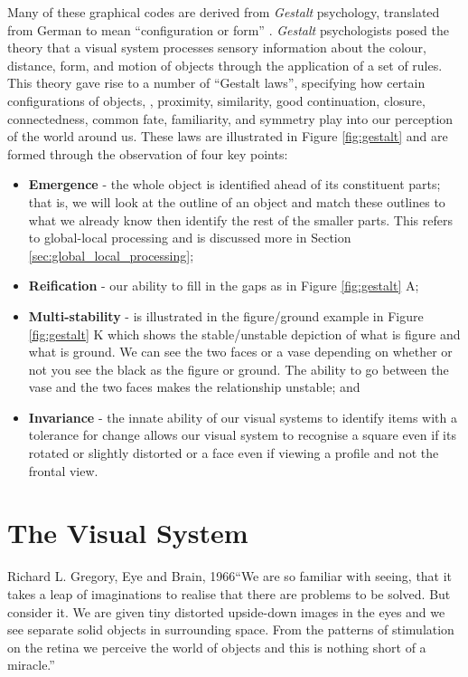 Many of these graphical codes are derived from \emph{Gestalt} psychology, translated from German to mean ``configuration or form'' \cite{kandel2012principles}. 
\emph{Gestalt} psychologists posed the theory that a visual system processes sensory information about the colour, distance, form, and motion of objects through the application of a set of rules. 
This theory gave rise to a number of ``Gestalt laws'', specifying how certain configurations of objects, \eg, proximity, similarity, good continuation, closure, connectedness, common fate, familiarity, and symmetry play into our perception of the world around us. 
These laws are illustrated in Figure \ref{fig:gestalt} and are formed through the observation of four key points:

\begin{itemize}
\item \textbf{Emergence} - the whole object is identified ahead of its constituent parts; that is, we will look at the outline of an object and match these outlines to what we already know then identify the rest of the smaller parts.
This refers to global-local processing and is discussed more in Section \ref{sec:global_local_processing};
\item \textbf{Reification} - our ability to fill in the gaps as in Figure \ref{fig:gestalt} A;
\item \textbf{Multi-stability} - is illustrated in the figure/ground example in Figure \ref{fig:gestalt} K which shows the stable/unstable depiction of what is figure and what is ground. 
We can see the two faces or a vase depending on whether or not you see the black as the figure or ground. 
The ability to go between the vase and the two faces makes the relationship unstable; and
\item \textbf{Invariance} - the innate ability of our visual systems to identify items with a tolerance for change allows our visual system to recognise a square even if its rotated or slightly distorted or a face even if viewing a profile and not the frontal view.
\end{itemize}


\section{The Visual System}
\label{sec:vis-processing}

\begin{chapquote}{Richard L. Gregory, Eye and Brain, 1966}{``We are so familiar with seeing, that it takes a leap of imaginations to realise that there are problems to be solved. But consider it. We are given tiny distorted upside-down images in the eyes and we see separate solid objects in surrounding space. From the patterns of stimulation on the retina we perceive the world of objects and this is nothing short of a miracle.''}
\end{chapquote}

